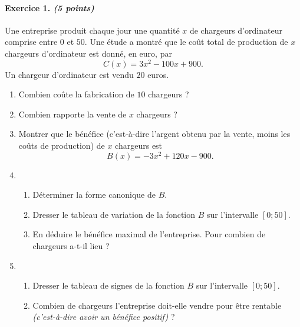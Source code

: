 \documentclass[11pt]{article}
\begin{document}
\paragraph{Exercice 1. \emph{(5 points)}} Une entreprise produit chaque jour une quantité $x$ de
chargeurs d'ordinateur comprise entre $0$ et $50$. Une étude a montré que le
coût total de production de $x$ chargeurs d'ordinateur est donné, en euro, par
\[
  C(x) = 3x^2-100x+900.
\]
Un chargeur d'ordinateur est vendu $20$ euros.
\begin{enumerate}
  \item Combien coûte la fabrication de $10$ chargeurs ?
  \item Combien rapporte la vente de $x$ chargeurs ?
  \item Montrer que le bénéfice (c'est-à-dire l'argent obtenu par la vente,
    moins les coûts de production) de $x$ chargeurs est
    \[
      B(x) = -3x^2+120x-900.
    \]
  \item \begin{enumerate}
      \item Déterminer la forme canonique de $B$.
      \item Dresser le tableau de variation de la fonction $B$ sur l'intervalle
        $\left[ 0; 50 \right]$.
      \item En déduire le bénéfice maximal de l'entreprise. Pour combien de
        chargeurs a-t-il lieu ?
    \end{enumerate}
  \item \begin{enumerate}
      \item Dresser le tableau de signes de la fonction $B$ sur l'intervalle $\left[
    0;50 \right]$.
  \item Combien de chargeurs l'entreprise doit-elle vendre pour être rentable
    \emph{(c'est-à-dire avoir un bénéfice positif)} ?
    \end{enumerate}

\end{enumerate}
\end{document}
